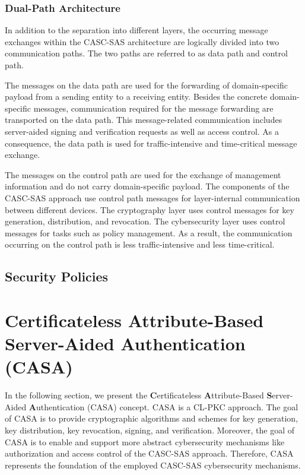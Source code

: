 \subsubsection{Dual-Path Architecture}
\label{sec:approach:casc:architecture:paths}
In addition to the separation into different layers, the occurring message exchanges within the CASC-SAS architecture are logically divided into two communication paths.
The two paths are referred to as data path and control path.

The messages on the data path are used for the forwarding of domain-specific payload from a sending entity to a receiving entity.
Besides the concrete domain-specific messages, communication required for the message forwarding are transported on the data path.
This message-related communication includes server-aided signing and verification requests as well as access control.
As a consequence, the data path is used for traffic-intensive and time-critical message exchange.

The messages on the control path are used for the exchange of management information and do not carry domain-specific payload.
The components of the CASC-SAS approach use control path messages for layer-internal communication between different devices.
The cryptography layer uses control messages for key generation, distribution, and revocation.
The cybersecurity layer uses control messages for tasks such as policy management.
As a result, the communication occurring on the control path is less traffic-intensive and less time-critical.

\subsection{Security Policies}

\section{Certificateless Attribute-Based Server-Aided Authentication (CASA)}
\label{sec:approach:casa}
In the following section, we present the \textbf{C}ertificateless \textbf{A}ttribute-Based \textbf{S}erver-Aided \textbf{A}uthentication (CASA) concept.
CASA is a CL-PKC approach.
The goal of CASA is to provide cryptographic algorithms and schemes for key generation, key distribution, key revocation, signing, and verification.
Moreover, the goal of CASA is to enable and support more abstract cybersecurity mechanisms like authorization and access control of the CASC-SAS approach.
Therefore, CASA represents the foundation of the employed CASC-SAS cybersecurity mechanisms.

